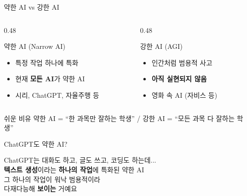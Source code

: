 \documentclass[aspectratio=169]{beamer}
\begin{document}
\begin{frame}{약한 AI vs 강한 AI}
\begin{columns}
\begin{column}{0.48\textwidth}
\begin{block}{ 약한 AI (Narrow AI)}
\begin{itemize}
    \item 특정 작업 하나에 특화
    \item 현재 \textbf{모든 AI}가 약한 AI
    \item 시리, ChatGPT, 자율주행 등
\end{itemize}
\end{block}
\end{column}
\begin{column}{0.48\textwidth}
\begin{block}{ 강한 AI (AGI)}
\begin{itemize}
    \item 인간처럼 범용적 사고
    \item \textbf{아직 실현되지 않음}
    \item 영화 속 AI (자비스 등)
\end{itemize}
\end{block}
\end{column}
\end{columns}

\vspace{0.5cm}
\begin{alertblock}{ 쉬운 비유}
약한 AI = ``한 과목만 잘하는 학생'' / 강한 AI = ``모든 과목 다 잘하는 학생''
\end{alertblock}
\end{frame}

\begin{frame}{ChatGPT도 약한 AI?}
\begin{center}
\Large ChatGPT는 대화도 하고, 글도 쓰고, 코딩도 하는데...\\
\vspace{0.5cm}
\pause
\textbf{\color{primary}텍스트 생성}이라는 \textbf{하나의 작업}에 특화된 약한 AI\\
\vspace{0.3cm}
\normalsize 그 하나의 작업이 워낙 범용적이라\\다재다능해 \textbf{보이는} 거예요
\end{center}
\end{frame}
\end{document}
